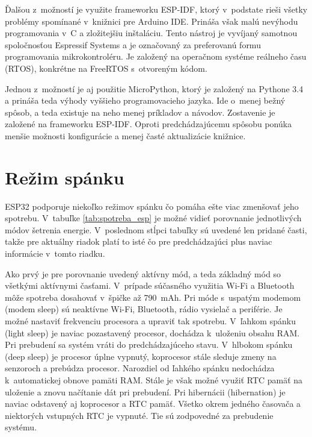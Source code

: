 Ďalšou z~možností je využite frameworku ESP-IDF, ktorý v~podstate rieši všetky problémy spomínané v~knižnici pre Arduino IDE. Prináša však malú nevýhodu programovania v~C a zložitejšiu inštaláciu. Tento nástroj je vyvíjaný samotnou spoločnosťou Espressif Systems a je označovaný za preferovanú formu programovania mikrokontroléru. Je založený na operačnom systéme reálneho času (RTOS), konkrétne na FreeRTOS s~otvoreným kódom.

Jednou z~možností je aj použitie MicroPython, ktorý je založený na Pythone 3.4 a prináša teda výhody vyššieho programovacieho jazyka. Ide o~menej bežný spôsob, a teda existuje na neho menej príkladov a návodov. Zostavenie je založené na frameworku ESP-IDF. Oproti predchádzajúcemu spôsobu ponúka menšie možnosti konfigurácie a menej časté aktualizácie knižnice.

\section{Režim spánku}\label{sec:esp-sleep}

ESP32 podporuje niekoľko režimov spánku čo pomáha ešte viac zmenšovať jeho spotrebu. V~tabuľke \ref{tab:spotreba_esp} je možné vidieť porovnanie jednotlivých módov šetrenia energie. V~poslednom stĺpci tabuľky sú uvedené len pridané časti, takže pre aktuálny riadok platí to isté čo pre predchádzajúci plus naviac informácie v~tomto riadku.

Ako prvý je pre porovnanie uvedený aktívny mód, a teda základný mód so všetkými aktívnymi časťami. V~prípade súčasného využitia Wi-Fi a Bluetooth môže spotreba dosahovať v~špičke až 790~mAh. Pri móde s~uspatým modemom (modem sleep) sú neaktívne Wi-Fi, Bluetooth, rádio vysielač a periférie. Je možné nastaviť frekvenciu procesora a upraviť tak spotrebu. V~ľahkom spánku (light sleep) je naviac pozastavený procesor, dochádza k~uloženiu obsahu RAM. Pri prebudení sa systém vráti do predchádzajúceho stavu. V~hlbokom spánku (deep sleep) je procesor úplne vypnutý, koprocesor stále sleduje zmeny na senzoroch a prebúdza procesor. Narozdiel od ľahkého spánku nedochádza k~automatickej obnove pamäti RAM. Stále je však možné využiť RTC pamäť na uloženie a znovu načítanie dát pri prebudení. Pri hibernácii (hibernation) je naviac odstavený aj koprocesor a RTC pamäť. Všetko okrem jedného časovača a niektorých vstupných RTC je vypnuté. Tie sú zodpovedné za prebudenie systému.\cite{esp-sleep}

